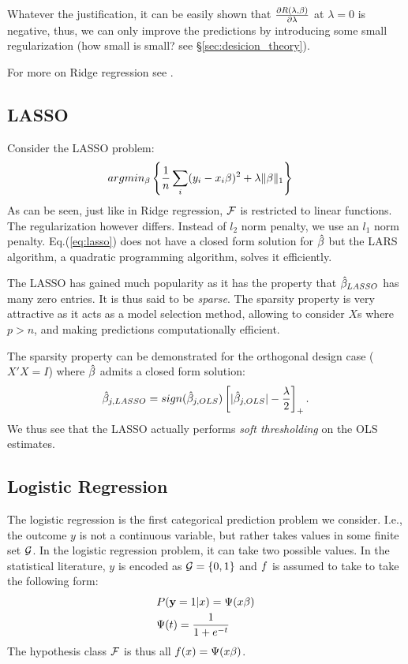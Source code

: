 Whatever the justification, it can be easily shown that $\frac{\partial R(\lambda,\beta)}{\partial \lambda}$ at $\lambda=0$ is negative, thus, we can only improve the predictions by introducing some small regularization (how small is small? see \S\ref{sec:desicion_theory}).


For more on Ridge regression see \cite{hastie_elements_2003}.


\subsection{LASSO}
\label{sec:lasso}

Consider the LASSO problem:
\begin{align}
\label{eq:lasso}
	& argmin_{\beta}\left\{ \frac{1}{n}\sum_i (y_i-x_i\beta)^2 + \lambda \Vert \beta \Vert_1 \right\} 
\end{align}
As can be seen, just like in Ridge regression, $\mathcal{F}$ is restricted to linear functions. The regularization however differs. Instead of $l_2$ norm penalty, we use an $l_1$ norm penalty.
Eq.(\ref{eq:lasso}) does not have a closed form solution for $\hat{\mathbf{\beta}}$ but the LARS algorithm, a quadratic programming algorithm, solves it efficiently.



The LASSO has gained much popularity as it has the property that $\hat{\mathbf{\beta}}_{LASSO}$ has many zero entries. It is thus said to be \emph{sparse}.
The sparsity property is very attractive as it acts as a model selection method, allowing to consider $X$s where $p>n$, and making predictions computationally efficient.

The sparsity property can be demonstrated for the orthogonal design case ($X'X=I$) where $\hat{\mathbf{\beta}}$ admits a closed form solution:
\begin{align}
	\hat{\mathbf{\beta}}_{j,LASSO} = sign(\hat{\mathbf{\beta}}_{j,OLS}) \left[|\hat{\mathbf{\beta}}_{j,OLS}|-\frac{\lambda}{2} \right]_+.
\end{align}
We thus see that the LASSO actually performs \emph{soft thresholding} on the OLS estimates. 




\subsection{Logistic Regression}
\label{sec:logistic}
The logistic regression is the first categorical prediction problem we consider. 
I.e., the outcome $y$ is not a continuous variable, but rather takes values in some finite set $\mathcal{G}$. In the logistic regression problem, it can take two possible values.
In the statistical literature, $y$ is encoded as $\mathcal{G}=\left\{ 0,1 \right\}$ and $f$ is assumed to take to take the following form:
\begin{align}
	& P(\mathbf{y}=1|x) = \Psi(x\beta) \\
	& \Psi(t) = \frac{1}{1+e^{-t}}
\end{align}
The hypothesis class $\mathcal{F}$ is thus all $f(x)=\Psi(x\beta)$.

